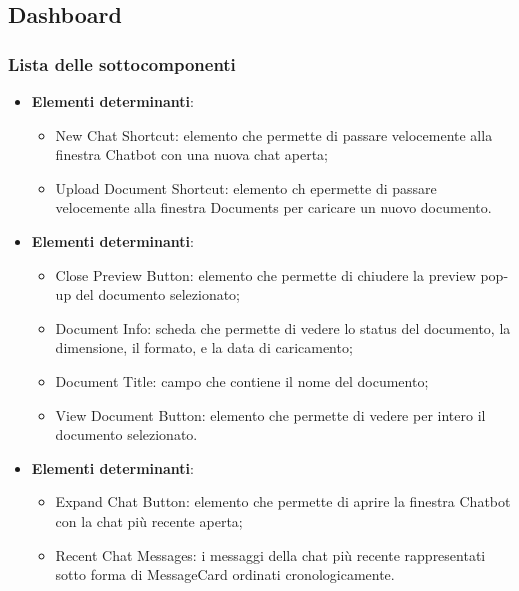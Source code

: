 \documentclass[10pt, a4paper]{article}
\begin{document}
\subsection{Dashboard}

\subsubsection{Lista delle sottocomponenti}

\label{DashboardHeaderDettaglio}
\begin{itemize}
    \item \textbf{Elementi determinanti}:
    \begin{itemize}
        \item New Chat Shortcut: elemento che permette di passare velocemente alla finestra Chatbot con una nuova chat aperta;
        \item Upload Document Shortcut: elemento ch epermette di passare velocemente alla finestra Documents per caricare un nuovo documento.   
    \end{itemize}
\end{itemize}


\label{DocumentPreviewDettaglio}
\begin{itemize}
    \item \textbf{Elementi determinanti}:
    \begin{itemize}
        \item Close Preview Button: elemento che permette di chiudere la preview pop-up del documento selezionato;
        \item Document Info: scheda che permette di vedere lo status del documento, la dimensione, il formato, e la data di caricamento;
        \item Document Title: campo che contiene il nome del documento;
        \item View Document Button: elemento che permette di vedere per intero il documento selezionato.
    \end{itemize}
\end{itemize}

\label{LatestChatContentDettaglio}
\begin{itemize}
    \item \textbf{Elementi determinanti}:
    \begin{itemize}
        \item Expand Chat Button: elemento che permette di aprire la finestra Chatbot con la chat più recente aperta;
        \item Recent Chat Messages: i messaggi della chat più recente rappresentati sotto forma di MessageCard ordinati cronologicamente.
    \end{itemize}
\end{itemize}
\end{document}
